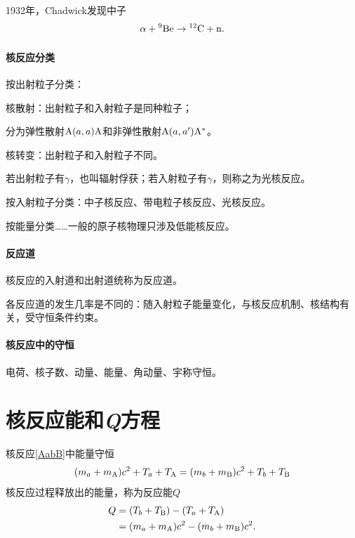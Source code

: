 1932年，Chadwick发现中子
\[
	\alpha+{^{9}\mathrm{Be}}\to{^{12}\mathrm{C}}+\mathrm n.
\]
\paragraph{核反应分类}
按出射粒子分类：
\begin{compactitem}
	\item 核散射：出射粒子和入射粒子是同种粒子；
	
	分为弹性散射${\mathrm{A}}(a,a){\mathrm{A}}$和非弹性散射${\mathrm{A}}(a,a'){\mathrm{A}^\ast}$。
	\item 核转变：出射粒子和入射粒子不同。
	
	若出射粒子有$\gamma$，也叫辐射俘获；若入射粒子有$\gamma$，则称之为光核反应。
\end{compactitem}
按入射粒子分类：中子核反应、带电粒子核反应、光核反应。

按能量分类……一般的原子核物理只涉及低能核反应。
\paragraph{反应道}核反应的入射道和出射道统称为反应道。

各反应道的发生几率是不同的：随入射粒子能量变化，与核反应机制、核结构有关，受守恒条件约束。

\paragraph{核反应中的守恒}电荷、核子数、动量、能量、角动量、宇称守恒。
\section{核反应能和\textit{Q}方程}
核反应\eqref{AabB}中能量守恒
\[
	(m_a+m_{\mathrm{A}})c^2+T_a+T_{\mathrm{A}}=(m_b+m_{\mathrm{B}})c^2+T_b+T_{\mathrm{B}}
\]
核反应过程释放出的能量，称为反应能$Q$
\begin{align}\notag
	Q&=(T_b+T_{\mathrm{B}})-(T_a+T_{\mathrm{A}})\\
	&=(m_a+m_{\mathrm{A}})c^2-(m_b+m_{\mathrm{B}})c^2.
\end{align}
